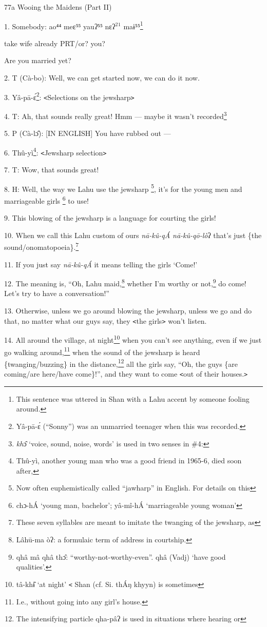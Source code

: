 
77a Wooing the Maidens (Part II)

1. Somebody:  ao⁴⁴ meɛ⁵⁵ yauʔ⁵⁵ nɛʔ\ensuremath{^2}\ensuremath{^1}  maɨ⁵⁵\footnote{This sentence was uttered in Shan with a Lahu accent by someone fooling around.}

take wife already PRT/or? you?

Are you married yet?

2. T (Cà-bo): Well, we can get started now, we can do it now.

3. Yâ-pā-ɛ́\footnote{Yâ-pā-ɛ́ (``Sonny'') was an unmarried teenager when this was recorded.}: \texttt{<}Selections on the jewsharp\texttt{>}

4. T: Ah, that sounds really great! Hmm --- maybe it wasn't recorded\.\footnote{\textit{kh}ɔ̂ `voice, sound, noise, words' is used in two senses in \#4:}

5. P (Cà-lɔ̂): [IN ENGLISH] You have rubbed out ---

6. Thû-yì\footnote{Thû-yì, another young man who was a good friend in 1965-6, died soon after,}: \texttt{<}Jewsharp selection\texttt{>}

7. T: Wow, that sounds great!

8. H: Well, the way we Lahu use the jewsharp \footnote{Now often euphemistically called ``jawharp'' in English. For details on this}, it's for the young men and marriageable
girls \footnote{chɔ-hÁ `young man, bachelor'; yâ-mî-hÁ `marriageable young woman'} to use!

9. This blowing of the jewsharp is a language for courting the girls!

10. When we call this Lahu custom of ours \textit{nā-kû-qÁ nā-kû-qō-lò}ʔ
that's just \{the sound/onomatopoeia\}.\footnote{These seven syllables are meant to imitate the twanging of the jewsharp, as}

11. If you just say \textit{nā-kû-qÁ} it means telling the girls `Come!'

12. The meaning is, ``Oh, Lahu maid,\footnote{Lâhū-ma òʔ: a formulaic term of address in courtship.} whether I'm worthy or not,\footnote{qhâ mâ qhâ thɔ̂: ``worthy-not-worthy-even''. qhâ (Vadj) `have good qualities'.} do come!
Let's try to have a conversation!''

13. Otherwise, unless we go around blowing the jewsharp, unless we go and do that,
no matter what our guys say, they \texttt{<}the girls\texttt{>} won't listen.

14. All around the village, at night\footnote{tâ-khɨ̂ `at night' \texttt{<} Shan (cf. Si. thÁŋ khyyn) is sometimes} when you can't see anything, even if we
just go walking around,\footnote{I.e., without going into any girl's house.} when the sound of the jewsharp is heard \{twanging/buzzing\}
in the distance,\footnote{The intensifying particle qha-pâʔ is used in situations where hearing or} all the girls say, ``Oh, the guys \{are coming/are here/have
come\}!'', and they want to come \texttt{<}out of their houses.\texttt{>}

